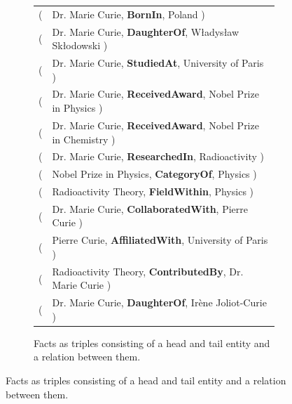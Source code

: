 \begin{figure}[h]
\centering

\begin{subfigure}[t]{\textwidth}
\centering
\small
\begin{tabular}{@{} >{\ttfamily}l @{\hspace{0.5em}} l @{}}
( & Dr. Marie Curie, \textbf{BornIn}, Poland )\\
( & Dr. Marie Curie, \textbf{DaughterOf}, Władysław Skłodowski )\\
( & Dr. Marie Curie, \textbf{StudiedAt}, University of Paris )\\
( & Dr. Marie Curie, \textbf{ReceivedAward}, Nobel Prize in Physics )\\
( & Dr. Marie Curie, \textbf{ReceivedAward}, Nobel Prize in Chemistry )\\
( & Dr. Marie Curie, \textbf{ResearchedIn}, Radioactivity )\\
( & Nobel Prize in Physics, \textbf{CategoryOf}, Physics )\\
( & Radioactivity Theory, \textbf{FieldWithin}, Physics )\\
( & Dr. Marie Curie, \textbf{CollaboratedWith}, Pierre Curie )\\
( & Pierre Curie, \textbf{AffiliatedWith}, University of Paris )\\
( & Radioactivity Theory, \textbf{ContributedBy}, Dr. Marie Curie )\\
( & Dr. Marie Curie, \textbf{DaughterOf}, Irène Joliot-Curie )
\end{tabular}
\caption{Facts as triples consisting of a head and tail entity and a relation between them.}
\label{fig:knowledge_graph_triples_vert}
\end{subfigure}

\vspace{1em} %


\end{figure}
